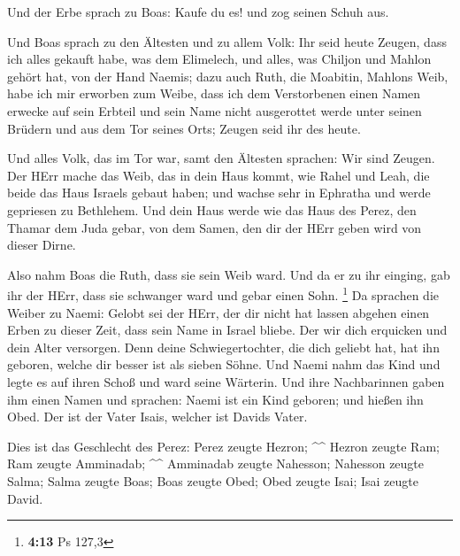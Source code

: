  Und der Erbe sprach zu Boas: Kaufe du es! und zog seinen
Schuh aus.

 Und Boas sprach zu den Ältesten und zu allem Volk: Ihr seid
heute Zeugen, dass ich alles gekauft habe, was dem Elimelech, und alles,
was Chiljon und Mahlon gehört hat, von der Hand Naemis; 
dazu auch Ruth, die Moabitin, Mahlons Weib, habe ich mir erworben zum
Weibe, dass ich dem Verstorbenen einen Namen erwecke auf sein Erbteil
und sein Name nicht ausgerottet werde unter seinen Brüdern und aus dem
Tor seines Orts; Zeugen seid ihr des heute.

 Und alles Volk, das im Tor war, samt den Ältesten
sprachen: Wir sind Zeugen. Der HErr mache das Weib, das in dein Haus
kommt, wie Rahel und Leah, die beide das Haus Israels gebaut haben; und
wachse sehr in Ephratha und werde gepriesen zu Bethlehem. 
Und dein Haus werde wie das Haus des Perez, den Thamar dem Juda gebar,
von dem Samen, den dir der HErr geben wird von dieser Dirne.

 Also nahm Boas die Ruth, dass sie sein Weib ward. Und da
er zu ihr einging, gab ihr der HErr, dass sie schwanger ward und gebar
einen Sohn. \footnote{\textbf{4:13} Ps 127,3}  Da sprachen
die Weiber zu Naemi: Gelobt sei der HErr, der dir nicht hat lassen
abgehen einen Erben zu dieser Zeit, dass sein Name in Israel bliebe.
 Der wir dich erquicken und dein Alter versorgen. Denn
deine Schwiegertochter, die dich geliebt hat, hat ihn geboren, welche
dir besser ist als sieben Söhne.  Und Naemi nahm das Kind
und legte es auf ihren Schoß und ward seine Wärterin.  Und
ihre Nachbarinnen gaben ihm einen Namen und sprachen: Naemi ist ein Kind
geboren; und hießen ihn Obed. Der ist der Vater Isais, welcher ist
Davids Vater.

 Dies ist das Geschlecht des Perez: Perez zeugte Hezron;
\^{}\^{}  Hezron zeugte Ram; Ram zeugte Amminadab; \^{}\^{}
 Amminadab zeugte Nahesson; Nahesson zeugte Salma;
 Salma zeugte Boas; Boas zeugte Obed;  Obed
zeugte Isai; Isai zeugte David.

